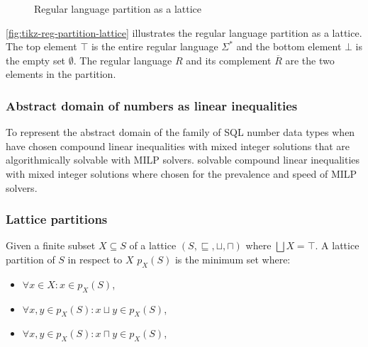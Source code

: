 \begin{figure}[!htb]
    \caption{Regular language partition as a lattice}
    \label{fig:tikz-reg-partition-lattice}
\end{figure}
\autoref{fig:tikz-reg-partition-lattice} illustrates the regular language partition as a lattice. The top element $\top$ is the entire regular language $\Sigma^*$ and the bottom element $\bot$ is the empty set $\emptyset$. The regular language $R$ and its complement $\overline{R}$ are the two elements in the partition.

\subsubsection{Abstract domain of numbers as linear inequalities}\label{subsubsec:abstract_domains_numbers}

To represent the abstract domain of the family of SQL number data types when have chosen compound linear inequalities with mixed integer solutions that are algorithmically solvable with MILP solvers.
solvable compound linear inequalities with mixed integer solutions where chosen for the prevalence and speed of MILP solvers.

\subsubsection{Lattice partitions}

\begin{definition}
    Given a finite subset $X \subseteq S$ of a lattice $(S, \sqsubseteq, \sqcup, \sqcap)$ where $\bigsqcup X = \top$.
    A lattice partition of $S$ in respect to $X$ $p_{X}(S)$ is the minimum set where:
    \begin{itemize}
        \item $\forall x \in X: x \in p_X(S)$,
        \item $\forall x, y \in p_X(S) : x \sqcup y \in p_X(S)$,
        \item $\forall x, y \in p_X(S) : x \sqcap y \in p_X(S)$,
    \end{itemize}
\end{definition}

